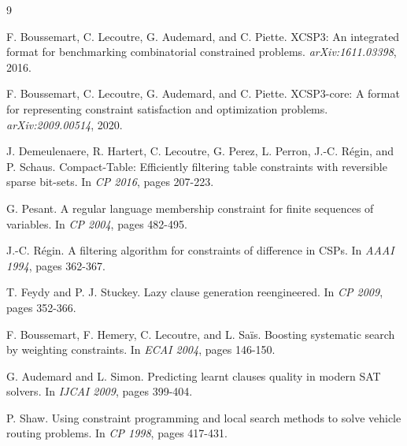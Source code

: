 \documentclass[10pt,letterpaper]{article}
\begin{document}
\vspace{-0.25em}
\begin{thebibliography}{9}
\small
\setlength{\itemsep}{0.05em}
\setlength{\parskip}{0pt}

F. Boussemart, C. Lecoutre, G. Audemard, and C. Piette.
XCSP3: An integrated format for benchmarking combinatorial constrained
problems. \emph{arXiv:1611.03398}, 2016.

F. Boussemart, C. Lecoutre, G. Audemard, and C. Piette.
XCSP3-core: A format for representing constraint satisfaction and optimization
problems. \emph{arXiv:2009.00514}, 2020.

J. Demeulenaere, R. Hartert, C. Lecoutre, G. Perez, L. Perron,
J.-C. R\'egin, and P. Schaus. Compact-Table: Efficiently filtering table
constraints with reversible sparse bit-sets. In \emph{CP 2016}, pages 207-223.

G. Pesant. A regular language membership constraint for finite sequences of
variables. In \emph{CP 2004}, pages 482-495.

J.-C. R\'egin. A filtering algorithm for constraints of difference in CSPs.
In \emph{AAAI 1994}, pages 362-367.

T. Feydy and P. J. Stuckey. Lazy clause generation reengineered.
In \emph{CP 2009}, pages 352-366.

F. Boussemart, F. Hemery, C. Lecoutre, and L. Sa\"is.
Boosting systematic search by weighting constraints.
In \emph{ECAI 2004}, pages 146-150.

G. Audemard and L. Simon. Predicting learnt clauses quality in modern SAT
solvers. In \emph{IJCAI 2009}, pages 399-404.

P. Shaw. Using constraint programming and local search methods to solve vehicle
routing problems. In \emph{CP 1998}, pages 417-431.

\end{thebibliography}
\end{document}
